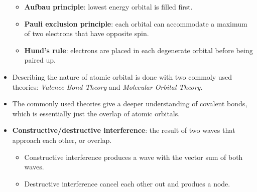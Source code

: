 \documentclass[12pt,a4paper]{article}
\begin{document}
\begin{itemize}
        \begin{itemize}
            \item \textbf{Aufbau principle}: lowest energy orbital is filled first.
            \item \textbf{Pauli exclusion principle}: each orbital can accommodate a maximum of two electrons that have opposite spin.
            \item \textbf{Hund's rule}: electrons are placed in each degenerate orbital before being paired up.
        \end{itemize}
    \item Describing the nature of atomic orbital is done with two commoly used theories: \textit{Valence Bond Theory} and \textit{Molecular Orbital Theory}.
    \item The commonly used theories give a deeper understanding of covalent bonds, which is essentially just the {\color{o-Sun}overlap of atomic orbitals}.
    \item \textbf{Constructive/destructive interference}: the result of two waves that approach each other, or overlap.
        \begin{itemize}
            \item Constructive interference produces a wave with the vector sum of both waves.
            \item Destructive interference cancel each other out and produes a node.
        \end{itemize}


\end{itemize}
\end{document}
